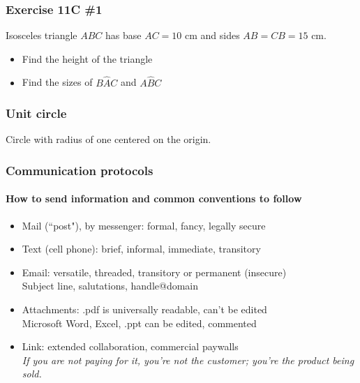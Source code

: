 \documentclass{beamer}
\begin{document}
\frame
{
  \frametitle{Exercise 11C \#1}
  Isosceles triangle $ABC$ has base $AC = 10 \text{ cm}$ and sides $AB=CB=15 \text{ cm}$.
\begin{itemize}
      \item Find the height of the triangle
      \item Find the sizes of $B\hat{A}C$ and $A\hat{B}C$
\end{itemize}
\begin{center}
\end{center}
 }

\frame
{
  \frametitle{Unit circle}
  Circle with radius of one centered on the origin.
\begin{center}
\end{center}
 }

\frame
{
  \frametitle{Communication protocols}
  \framesubtitle{How to send information and common conventions to follow}
\begin{itemize}
      \item Mail (``post"), by messenger: formal, fancy, legally secure
      \item Text (cell phone): brief, informal, immediate, transitory
      \item Email: versatile, threaded, transitory or permanent (insecure)\\
      Subject line, salutations, handle@domain
      \item Attachments: .pdf is universally readable, can't be edited\\
      Microsoft Word, Excel, .ppt can be edited, commented
      \item Link: extended collaboration, commercial paywalls\\
      \emph{If you are not paying for it, you're not the customer; you're the product being sold.}
\end{itemize}
 }
\end{document}
